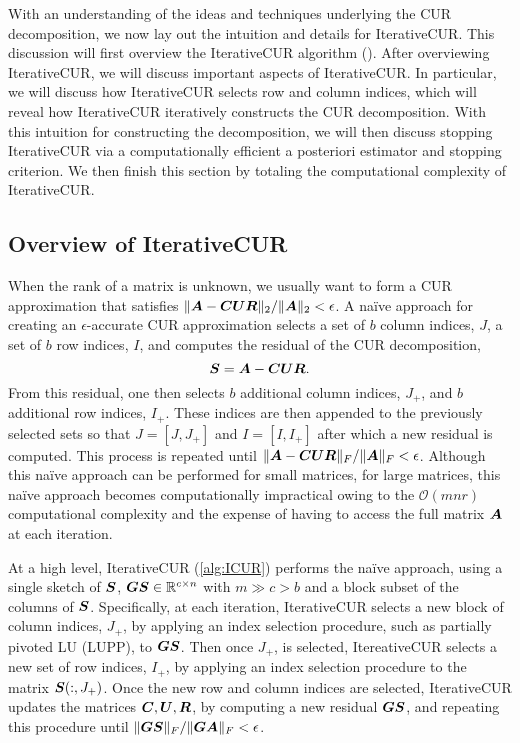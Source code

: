  With an understanding of the ideas and techniques underlying the CUR decomposition, we now lay out the intuition and details for IterativeCUR. This discussion will first overview the IterativeCUR algorithm (\icur). After overviewing IterativeCUR, we will discuss important aspects of IterativeCUR. In particular, we will discuss how IterativeCUR selects row and column indices, which will reveal how IterativeCUR  iteratively constructs the CUR decomposition. With this intuition for constructing the decomposition, we will then discuss stopping IterativeCUR via a computationally efficient a posteriori estimator and stopping criterion. We then finish this section by totaling the computational complexity of IterativeCUR.


\subsection{Overview of IterativeCUR}
When the rank of a matrix is unknown, we usually want to form a CUR approximation that satisfies $\|\boldsymbol{A} - \boldsymbol{C} \boldsymbol{U} \boldsymbol{R}\|_2 / \|\boldsymbol{A}\|_2 < \epsilon$. A na\"ive approach for creating an $\epsilon$-accurate CUR approximation selects a set of $b$ column indices, $J$, a set of $b$ row indices, $I$, and computes the residual of the CUR decomposition,
\begin{equation}
    \boldsymbol{S} = \boldsymbol{A} - \boldsymbol{C} \boldsymbol{U} \boldsymbol{R}.
\end{equation}
From this residual, one then selects $b$ additional column indices, $J_+$, and $b$ additional row indices, $I_+$. These indices are then appended to the previously selected sets so that $J = [J, J_+]$ and $I = [I, I_+]$ after which a new residual is computed. This process is repeated until $\|\boldsymbol{A} -\boldsymbol{C} \boldsymbol{U} \boldsymbol{R}\|_F/ \|\boldsymbol{A}\|_F < \epsilon$. Although this na\"ive approach can be performed for small matrices, for large matrices, this na\"ive approach becomes computationally impractical owing to the $\mathcal{O}(mnr)$ computational complexity and the expense of having to access the full matrix $\boldsymbol{A}$ at each iteration. 


At a high level, IterativeCUR (\cref{alg:ICUR}) performs the na\"ive approach, using a single sketch of $\boldsymbol{S}$, $\boldsymbol{G} \boldsymbol{S} \in \mathbb{R}^{c \times n}$ with $m \gg c > b$ and a block subset of the columns of $\boldsymbol{S}$. Specifically, at each iteration, IterativeCUR selects a new block of column indices, $J_+$, by applying an index selection procedure, such as partially pivoted LU (LUPP), to $\boldsymbol{G} \boldsymbol{S}$. Then once $J_+$, is selected, ItereativeCUR selects a new set of row indices, $I_+$, by applying an index selection procedure to the matrix $\boldsymbol{S}(:, J_+)$.  Once the new row and column indices are selected, IterativeCUR updates the matrices $\boldsymbol{C}, \boldsymbol{U}, \boldsymbol{R}$, by computing a new residual $\boldsymbol{G}\boldsymbol{S}$, and repeating this procedure until $\|\boldsymbol{G} \boldsymbol{S}\|_F / \| \boldsymbol{G} \boldsymbol{A}\|_F < \epsilon$. 


